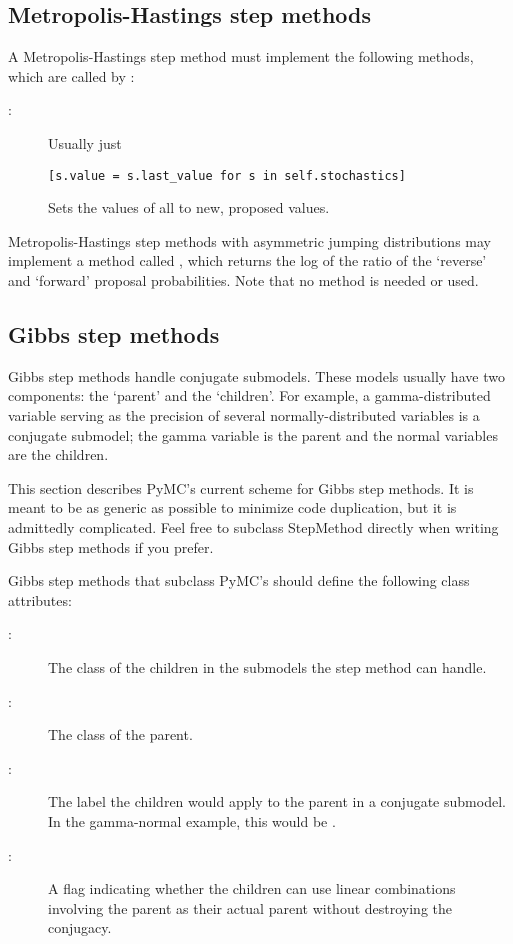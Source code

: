 \subsection*{Metropolis-Hastings step methods} \label{user-metro}
A Metropolis-Hastings step method must implement the following methods, which are called by :
\begin{description}

   \item[:] Usually just
   \begin{verbatim}
[s.value = s.last_value for s in self.stochastics]
   \end{verbatim}
   \item[] Sets the values of all  to new, proposed values.
\end{description}
Metropolis-Hastings step methods with asymmetric jumping distributions may implement a method called , which returns the log of the ratio of the `reverse' and `forward' proposal probabilities. Note that no  method is needed or used.

\hypertarget{user-gibbs}{}
\subsection*{Gibbs step methods} \label{user-gibbs}

Gibbs step methods handle conjugate submodels. These models usually have two components: the `parent' and the `children'. For example, a gamma-distributed variable serving as the precision of several normally-distributed variables is a conjugate submodel; the gamma variable is the parent and the normal variables are the children. 

This section describes PyMC's current scheme for Gibbs step methods. It is meant to be as generic as possible to minimize code duplication, but it is admittedly complicated. Feel free to subclass StepMethod directly when writing Gibbs step methods if you prefer.

Gibbs step methods that subclass PyMC's  should define the following class attributes:
\begin{description}
   \item[:] The class of the children in the submodels the step method can handle.
   \item[:] The class of the parent.
   \item[:] The label the children would apply to the parent in a conjugate submodel. In the gamma-normal example, this would be .
   \item[:] A flag indicating whether the children can use linear combinations involving the parent as their actual parent without destroying the conjugacy.
\end{description}

